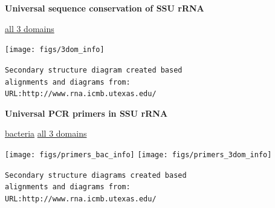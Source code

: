 \documentclass[landscape]{slides}
\begin{document}
\begin{slide}
\begin{center}
\large
\textbf{Universal sequence conservation of SSU rRNA}
\end{center}
\small
\hspace{4.5in}
\underline{all 3 domains}

\begin{center}
\texttt{[image: figs/3dom\_info]}
\end{center}

\tiny{\texttt{Secondary structure diagram created based}} \\
\tiny{\texttt{alignments and diagrams from:}} \\
\tiny{\texttt{URL:http://www.rna.icmb.utexas.edu/}}
\vfill
\end{slide}

\begin{slide}
\begin{center}
\large
\textbf{Universal PCR primers in SSU rRNA}
\end{center}
\small
\hspace{2.7in}
\underline{bacteria}
\hspace{3in}
\underline{all 3 domains}

\begin{center}
\texttt{[image: figs/primers\_bac\_info]}
\texttt{[image: figs/primers\_3dom\_info]}
\end{center}

\begin{flushright}
\tiny{\texttt{Secondary structure diagrams created based}} \\
\tiny{\texttt{alignments and diagrams from:}} \\
\tiny{\texttt{URL:http://www.rna.icmb.utexas.edu/}}
\end{flushright}
\vfill
\end{slide}
\end{document}
